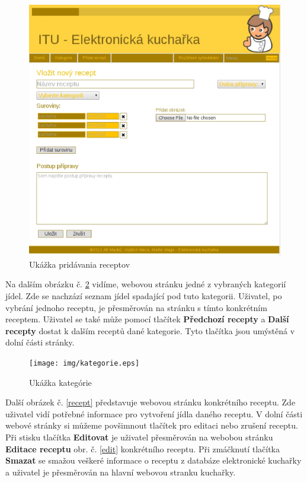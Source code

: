 \documentclass[12pt,a4paper,titlepage,final]{article}
\begin{document}
\begin{figure}

\begin{center}

\includegraphics[scale=0.6]{img/pridatrecept.eps} 
\caption{Ukážka pridávania receptov}
\label{pridani}

\end{center}

\end{figure}
\newpage
Na dalším obrázku č. \ref{kategorie} vidíme, webovou stránku jedné z vybraných kategorií jídel. Zde se nachzází seznam jídel spadající pod tuto kategorii. Uživatel, po vybrání jednoho receptu, je přesměrován na stránku s tímto konkrétním receptem. Uživatel se také může pomocí tlačítek \textbf{Předchozí recepty} a \textbf{Další recepty} dostat k dalším receptů dané kategorie. Tyto tlačítka jsou umýstěná v dolní části stránky.\newline

\begin{figure}

\begin{center}

\texttt{[image: img/kategorie.eps]} 
\caption{Ukážka kategórie}
\label{kategorie}

\end{center}

\end{figure}
\newpage
Další obrázek č. \ref{recept} představuje webovou stránku konkrétního receptu. Zde uživatel vidí potřebné informace pro vytvoření jídla daného receptu. V dolní části webové stránky si můžeme povšimnout tlačítek pro editaci nebo zrušení receptu. Při stisku tlačítka \textbf{Editovat} je uživatel přesměrován na webobou stránku \textbf{Editace receptu} obr. č. \ref{edit} konkrétního receptu. Při zmáčknutí tlačítka \textbf{Smazat} se smažou veškeré informace o receptu z databáze elektronické kuchařky a uživatel je přesměrován na hlavní webovou stranku kuchařky.\newline
\end{document}
